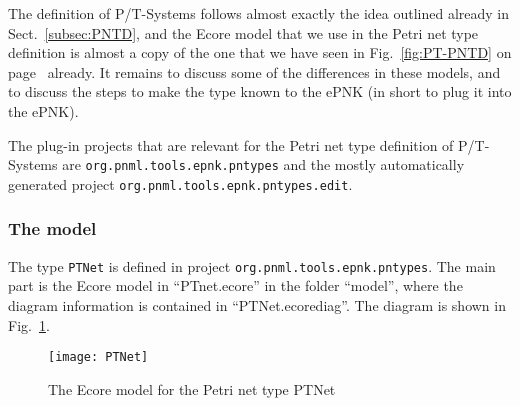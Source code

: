 The definition of P/T-Systems follows almost exactly the idea outlined
already in Sect.~\ref{subsec:PNTD}, and the Ecore model that we use in the
Petri net type definition is almost a copy of the one that we have seen in
Fig.~\ref{fig:PT-PNTD} on page~\pageref{fig:PT-PNTD} already. It remains to
discuss some of the differences in these models, and to discuss the steps to
make the type known to the ePNK (in short to plug it into the ePNK).

The plug-in projects that are relevant for the Petri net type definition
of P/T-Systems are {\tt org.pnml.tools.epnk.pntypes} and the mostly
automatically generated project {\tt org.pnml.tools.epnk.pntypes.edit}.

\subsubsection{The model}
\label{subsubsec:PNTD-model}
The type {\tt PTNet} is defined in project {\tt org.pnml.tools.epnk.pntypes}.
The main part is the Ecore
model in ``PTnet.ecore'' in the folder ``model'', where the diagram 
information is contained in ``PTNet.ecorediag''.
The diagram is shown in Fig.~\ref{fig:PTNetPNTD}.

\begin{figure}[hbt!!]
  \centerline{\texttt{[image: PTNet]}}
  \caption{The Ecore model for the Petri net type PTNet}
  \label{fig:PTNetPNTD}
\end{figure}

